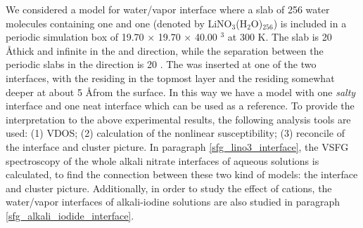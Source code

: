 We considered a model for water/vapor interface where a slab of 256 water molecules containing one \Li and 
one \nitrate (denoted by LiNO$_3$(H$_2$O)$_{256}$) is included in a periodic simulation box of 19.70 $\times $ 19.70 $\times $ 40.00 \A$^3$ at 300 K.
The slab is 20 \AA thick and infinite in the \X and \Y direction, while the
separation between the periodic slabs in the \Z direction is 20 \A.
The  \LiN was inserted at one of the two interfaces, with the \nitrate residing in the topmost layer and 
the \Li residing somewhat deeper at about 5 \AA from the surface. In this way we have a model with one \emph{salty} interface
and one neat interface which can be used as a reference.  
To provide the interpretation to the above experimental results, the following analysis tools are used:
(1) VDOS; 
(2) calculation of the nonlinear susceptibility; 
(3) reconcile of the interface and cluster picture.
In paragraph \ref{sfg_lino3_interface}, the VSFG spectroscopy of the whole alkali nitrate interfaces of  aqueous solutions is calculated,
to find the connection between these two kind of models: the interface and cluster picture.
Additionally, in order to study the effect of cations, the water/vapor interfaces of alkali-iodine solutions are also studied in paragraph \ref{sfg_alkali_iodide_interface}.


